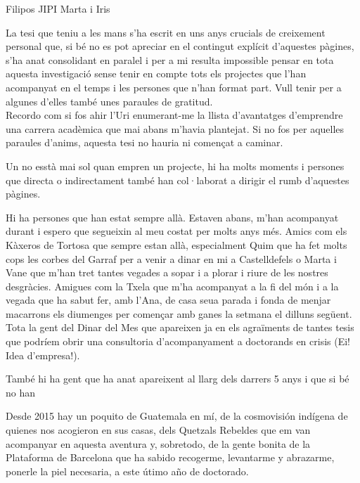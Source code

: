 \documentclass[
11pt, %
english, %
onehalfspacing %
]{MastersDoctoralThesis} %
\begin{document}
\begin{acknowledgements}
\addchaptertocentry{\acknowledgementname} %

Filipos
JIPI
Marta i Iris

La tesi que teniu a les mans s'ha escrit en uns anys crucials de creixement personal que, si bé no es pot apreciar en el contingut explícit d'aquestes pàgines, s'ha anat consolidant en paralel i per a mi resulta impossible pensar en tota aquesta investigació sense tenir en compte tots els projectes que l'han acompanyat en el temps i les persones que n'han format part. Vull tenir per a algunes d'elles també unes paraules de gratitud.\\


Recordo com si fos ahir l'Uri enumerant-me la llista d'avantatges d'emprendre una carrera acadèmica que mai abans m'havia plantejat. Si no fos per aquelles paraules d'anims, aquesta tesi no hauria ni començat a caminar.

Un no esstà mai sol quan empren un projecte, hi ha molts moments i persones que directa o indirectament també han col·laborat a dirigir el rumb d'aquestes pàgines.

Hi ha persones que han estat sempre allà. Estaven abans, m'han acompanyat durant i espero que segueixin al meu costat per molts anys més. Amics com els Kàxeros de Tortosa que sempre estan allà, especialment Quim que ha fet molts cops les corbes del Garraf per a venir a dinar en mi a Castelldefels o Marta i Vane que m'han tret tantes vegades a sopar i a plorar i riure de les nostres desgràcies. Amigues com la Txela que m'ha acompanyat a la fi del món i a la vegada que ha sabut fer, amb l'Ana, de casa seua parada i fonda de menjar macarrons els diumenges per començar amb ganes la setmana el dilluns següent. Tota la gent del Dinar del Mes que apareixen ja en els agraïments de tantes tesis que podríem obrir una consultoria d'acompanyament a doctorands en crisis (Ei! Idea d'empresa!).

També hi ha gent que ha anat apareixent al llarg dels darrers 5 anys i que si bé no han

Desde 2015 hay un poquito de Guatemala en mí, de la cosmovisión indígena de quienes nos acogieron en sus casas, dels Quetzals Rebeldes que em van acompanyar en aquesta aventura y, sobretodo, de la gente bonita de la Plataforma de Barcelona que ha sabido recogerme, levantarme y abrazarme, ponerle la piel necesaria, a este \'utimo año de doctorado.
%

\end{acknowledgements}
\end{document}
